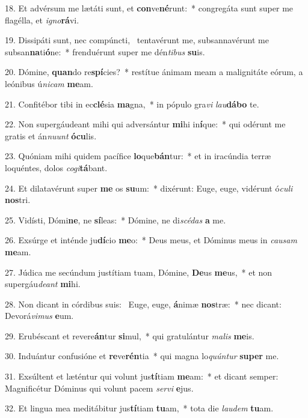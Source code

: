18. Et advérsum me lætáti sunt, et \textbf{con}ve\textbf{né}runt:~*  congregáta sunt super me flagélla, et \textit{i}\textit{gno}\textbf{rá}vi.\

19. Dissipáti sunt, nec compúncti, \dag\  tentavérunt me, subsannavérunt me subsan\textbf{na}ti\textbf{ó}ne:~*  frenduérunt super me dén\textit{ti}\textit{bus} \textbf{su}is.\

20. Dómine, \textbf{quan}do re\textbf{spí}cies?~*  restítue ánimam meam a malignitáte eórum, a leónibus ú\textit{ni}\textit{cam} \textbf{me}am.\

21. Confitébor tibi in ec\textbf{clé}sia \textbf{ma}gna,~*  in pópulo gra\textit{vi} \textit{lau}\textbf{dá}\textbf{bo} te.\

22. Non supergáudeant mihi qui adversántur \textbf{mi}hi in\textbf{í}que:~*  qui odérunt me gratis et án\textit{nu}\textit{unt} \textbf{ó}\textbf{cu}lis.\

23. Quóniam mihi quidem pacífice \textbf{lo}que\textbf{bán}tur:~*  et in iracúndia terræ loquéntes, dolos \textit{co}\textit{gi}\textbf{tá}bant.\

24. Et dilatavérunt super \textbf{me} os \textbf{su}um:~*  dixérunt: Euge, euge, vidérunt ó\textit{cu}\textit{li} \textbf{nos}tri.\

25. Vidísti, Dómi\textbf{ne}, ne \textbf{sí}leas:~*  Dómine, ne di\textit{scé}\textit{das} \textbf{a} me.\

26. Exsúrge et inténde ju\textbf{dí}cio \textbf{me}o:~*  Deus meus, et Dóminus meus in \textit{cau}\textit{sam} \textbf{me}am.\

27. Júdica me secúndum justítiam tuam, Dómine, \textbf{De}us \textbf{me}us,~*  et non supergáu\textit{de}\textit{ant} \textbf{mi}hi.\

28. Non dicant in córdibus suis: \dag\  Euge, euge, \textbf{á}nimæ \textbf{nos}træ:~*  nec dicant: Devorá\textit{vi}\textit{mus} \textbf{e}um.\

29. Erubéscant et revere\textbf{án}tur \textbf{si}mul,~*  qui gratulántur \textit{ma}\textit{lis} \textbf{me}is.\

30. Induántur confusióne et \textbf{re}ve\textbf{rén}tia~*  qui magna lo\textit{quún}\textit{tur} \textbf{su}\textbf{per} me.\

31. Exsúltent et læténtur qui volunt jus\textbf{tí}tiam \textbf{me}am:~*  et dicant semper: Magnificétur Dóminus qui volunt pacem \textit{ser}\textit{vi} \textbf{e}jus.\

32. Et lingua mea meditábitur jus\textbf{tí}tiam \textbf{tu}am,~*  tota die \textit{lau}\textit{dem} \textbf{tu}am.\

